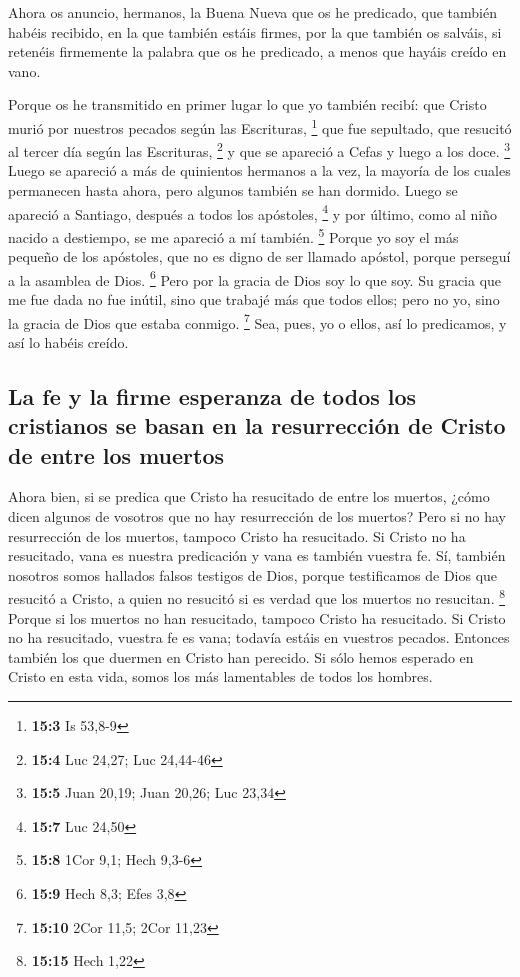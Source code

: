 \begin{paracol}{2}
 Ahora os anuncio, hermanos, la Buena Nueva que os he
predicado, que también habéis recibido, en la que también estáis firmes,
 por la que también os salváis, si retenéis firmemente la
palabra que os he predicado, a menos que hayáis creído en vano.

 Porque os he transmitido en primer lugar lo que yo
también recibí: que Cristo murió por nuestros pecados según las
Escrituras, \footnote{\textbf{15:3} Is 53,8-9}  que fue
sepultado, que resucitó al tercer día según las Escrituras, \footnote{\textbf{15:4}
  Luc 24,27; Luc 24,44-46}  y que se apareció a Cefas y
luego a los doce. \footnote{\textbf{15:5} Juan 20,19; Juan 20,26; Luc
  23,34}  Luego se apareció a más de quinientos hermanos a
la vez, la mayoría de los cuales permanecen hasta ahora, pero algunos
también se han dormido.  Luego se apareció a Santiago,
después a todos los apóstoles, \footnote{\textbf{15:7} Luc 24,50}
 y por último, como al niño nacido a destiempo, se me
apareció a mí también. \footnote{\textbf{15:8} 1Cor 9,1; Hech 9,3-6}
 Porque yo soy el más pequeño de los apóstoles, que no es
digno de ser llamado apóstol, porque perseguí a la asamblea de Dios.
\footnote{\textbf{15:9} Hech 8,3; Efes 3,8}  Pero por la
gracia de Dios soy lo que soy. Su gracia que me fue dada no fue inútil,
sino que trabajé más que todos ellos; pero no yo, sino la gracia de Dios
que estaba conmigo. \footnote{\textbf{15:10} 2Cor 11,5; 2Cor 11,23}
 Sea, pues, yo o ellos, así lo predicamos, y así lo
habéis creído.

\hypertarget{la-fe-y-la-firme-esperanza-de-todos-los-cristianos-se-basan-en-la-resurrecciuxf3n-de-cristo-de-entre-los-muertos}{%
\subsection{La fe y la firme esperanza de todos los cristianos se basan
en la resurrección de Cristo de entre los
muertos}\label{la-fe-y-la-firme-esperanza-de-todos-los-cristianos-se-basan-en-la-resurrecciuxf3n-de-cristo-de-entre-los-muertos}}

 Ahora bien, si se predica que Cristo ha resucitado de
entre los muertos, ¿cómo dicen algunos de vosotros que no hay
resurrección de los muertos?  Pero si no hay resurrección
de los muertos, tampoco Cristo ha resucitado.  Si Cristo
no ha resucitado, vana es nuestra predicación y vana es también vuestra
fe.  Sí, también nosotros somos hallados falsos testigos
de Dios, porque testificamos de Dios que resucitó a Cristo, a quien no
resucitó si es verdad que los muertos no resucitan. \footnote{\textbf{15:15}
  Hech 1,22}  Porque si los muertos no han resucitado,
tampoco Cristo ha resucitado.  Si Cristo no ha
resucitado, vuestra fe es vana; todavía estáis en vuestros pecados.
 Entonces también los que duermen en Cristo han perecido.
 Si sólo hemos esperado en Cristo en esta vida, somos los
más lamentables de todos los hombres.


\end{paracol}
